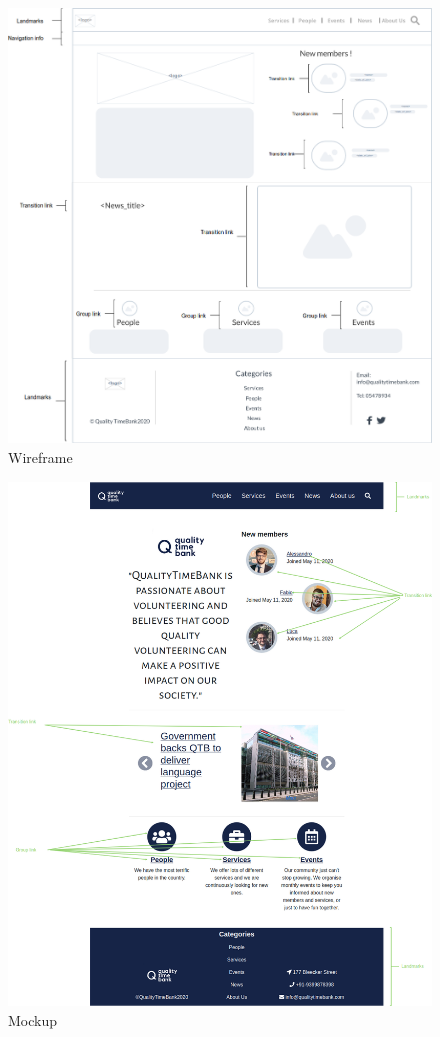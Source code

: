 \documentclass[a4paper, 11pt, parskip=half, headsepline]{scrreprt}
\begin{document}
\begin{figure}[H]
    \centering
    \includegraphics[width=0.93\linewidth, keepaspectratio]{wireframes/Homepage}
    \caption{Wireframe}
\end{figure}

\begin{figure}[H]
    \centering
    \includegraphics[width=1\linewidth, keepaspectratio]{mockups/Home_Page}
    \caption{Mockup}
\end{figure}
\end{document}

